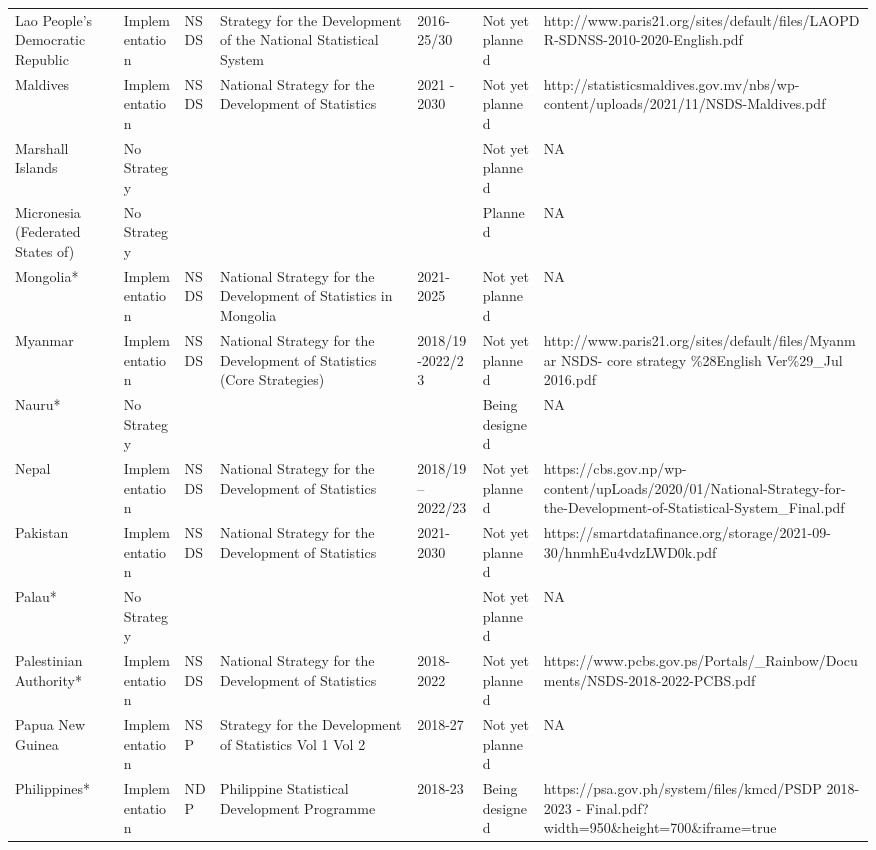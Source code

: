 \documentclass[
]{article}
\begin{document}
\begin{table}
\begin{tabular}[t]{lllllll}
Lao People's Democratic Republic & Implementation & NSDS & Strategy for the Development of the National Statistical System & 2016-25/30 & Not yet planned & http://www.paris21.org/sites/default/files/LAOPDR-SDNSS-2010-2020-English.pdf\\
Maldives & Implementation & NSDS & National Strategy for the Development of Statistics & 2021 - 2030 & Not yet planned & http://statisticsmaldives.gov.mv/nbs/wp-content/uploads/2021/11/NSDS-Maldives.pdf\\
\addlinespace
Marshall Islands & No Strategy &  &  &  & Not yet planned & NA\\
Micronesia (Federated States of) & No Strategy &  &  &  & Planned & NA\\
Mongolia* & Implementation & NSDS & National Strategy for the Development of Statistics in Mongolia & 2021-2025 & Not yet planned & NA\\
Myanmar & Implementation & NSDS & National Strategy for the Development of Statistics (Core Strategies) & 2018/19-2022/23 & Not yet planned & http://www.paris21.org/sites/default/files/Myanmar NSDS- core strategy \%28English Ver\%29\_Jul 2016.pdf\\
Nauru* & No Strategy &  &  &  & Being designed & NA\\
\addlinespace
Nepal & Implementation & NSDS & National Strategy for the Development of Statistics & 2018/19 – 2022/23 & Not yet planned & https://cbs.gov.np/wp-content/upLoads/2020/01/National-Strategy-for-the-Development-of-Statistical-System\_Final.pdf\\
Pakistan & Implementation & NSDS & National Strategy for the Development of Statistics & 2021-2030 & Not yet planned & https://smartdatafinance.org/storage/2021-09-30/hnmhEu4vdzLWD0k.pdf\\
Palau* & No Strategy &  &  &  & Not yet planned & NA\\
Palestinian Authority* & Implementation & NSDS & National Strategy for the Development of Statistics & 2018-2022 & Not yet planned & https://www.pcbs.gov.ps/Portals/\_Rainbow/Documents/NSDS-2018-2022-PCBS.pdf\\
Papua New Guinea & Implementation & NSP & Strategy for the Development of Statistics  Vol 1 Vol 2 & 2018-27 & Not yet planned & NA\\
\addlinespace
Philippines* & Implementation & NDP & Philippine Statistical Development Programme & 2018-23 & Being designed & https://psa.gov.ph/system/files/kmcd/PSDP 2018-2023 - Final.pdf?width=950\&height=700\&iframe=true\\

\end{tabular}
\end{table}
\end{document}
